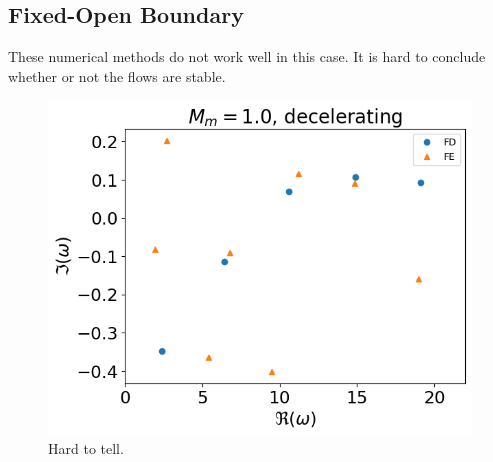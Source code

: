 \subsection{Fixed-Open Boundary}
These numerical methods do not work well in this case. It is hard to conclude whether or not the flows are stable.
\begin{figure} [H]
	\centering
	\includegraphics[width=0.7\linewidth]{img/numerical_experiments/fixed_open/decelerating_v}
	\caption{Hard to tell.}
	\label{fig:decelerating_v_fixed_open}
\end{figure}